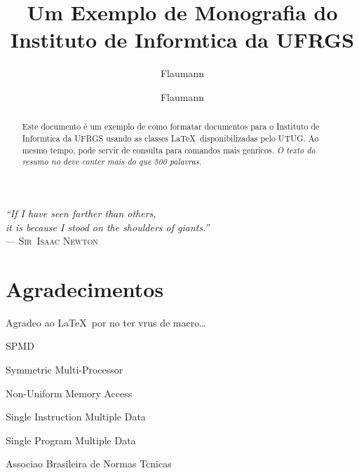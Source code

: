 \documentclass[diss]{template/setrem}
\title{Um Exemplo de Monografia do Instituto de Informtica da UFRGS}
\author{Flaumann}{Fritz Gutenberg}
\author{Flaumann}{John Gutenberg}
\begin{document}
\maketitle

\clearpage
\begin{flushright}
\mbox{}\vfill
{\sffamily\itshape
``If I have seen farther than others,\\
it is because I stood on the shoulders of giants.''\\}
--- \textsc{Sir~Isaac Newton}
\end{flushright}

\chapter*{Agradecimentos}
Agradeo ao \LaTeX\ por no ter vrus de macro\ldots

\tableofcontents

\begin{listofabbrv}{SPMD}
        \item[SMP] Symmetric Multi-Processor
        \item[NUMA] Non-Uniform Memory Access
        \item[SIMD] Single Instruction Multiple Data
        \item[SPMD] Single Program Multiple Data
        \item[ABNT] Associao Brasileira de Normas Tcnicas
\end{listofabbrv}


\listoffigures


\begin{abstract}
Este documento é um exemplo de como formatar documentos para o
Instituto de Informtica da UFRGS usando as classes \LaTeX\
disponibilizadas pelo UTUG\@. Ao mesmo tempo, pode servir de consulta
para comandos mais genricos. \emph{O texto do resumo no deve
conter mais do que 500 palavras.}
\end{abstract}
\end{document}
